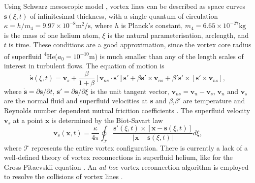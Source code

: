 \documentclass[%
superscriptaddress,
 amsmath,amssymb,
prl,
prb,
]{revtex4-2}
\def \s{\mathbf{s}}
\def \v{\mathbf{v}}
\def \x{\mathbf{x}}
\begin{document}
Using Schwarz mesoscopic model \cite{schwarzThreedimensionalVortexDynamics1988a}, vortex lines can be described as space curves $\s(\xi,t)$ of infinitesimal thickness, with a single quantum of circulation $\kappa=h/m_4=9.97\times10^{-8}\text{m}^2/\text{s}$, where $h$ is Planck's constant, $m_4=6.65\times10^{-27}\text{kg}$ is the mass of one helium atom, $\xi$ is the natural parameterisation, arclength, and $t$ is time. These conditions are a good approximation, since the vortex core radius of superfluid \textsuperscript{4}He($a_0=10^{-10}\text{m}$) is much smaller than any of the length scales of interest in turbulent flows. The equation of motion is
\begin{equation}
	\dot{\s}(\xi,t) = \v_s + \frac{\beta}{1+\beta}\left[\v_{ns}\cdot \s'\right]\s' + \beta\s'\times\v_{ns}+\beta'\s'\times\left[\s'\times \v_{ns}\right],
\end{equation}
where $\dot{\s}=\partial\s/\partial t$, $\s'=\partial\s/\partial \xi$ is the unit tangent vector, $\v_{ns}=\v_n - \v_s$, $\v_n$ and $\v_s$ are the normal fluid and superfluid velocities at $\s$ and $\beta$,$\beta'$ are temperature and Reynolds number dependent mutual fricition coefficients \cite{galantucciNewSelfconsistentApproach2020b}. The superfluid velocity $\v_s$ at a point $\x$ is determined by the Biot-Savart law
\begin{equation}
	\v_s(\x,t) = \frac{\kappa}{4\pi}\oint_{\mathcal{T}}\frac{\s'(\xi,t)\times\left[\x-\s(\xi,t)\right]}{|\x-\s(\xi,t)|}d\xi,
\end{equation}
where $\mathcal{T}$ represents the entire vortex configuration.
There is currently a lack of a well-defined theory of vortex reconnections in superfluid helium, like for the Gross-Pitaevskii equation \cite{villoisIrreversibleDynamicsVortex2020,villoisUniversalNonuniversalAspects2017a,promentMatchingTheoryCharacterize2020a}. An \emph{ad hoc} vortex reconnection algorithm is employed to resolve the collisions of vortex lines \cite{baggaleySensitivityVortexFilament2012a}.
\end{document}
